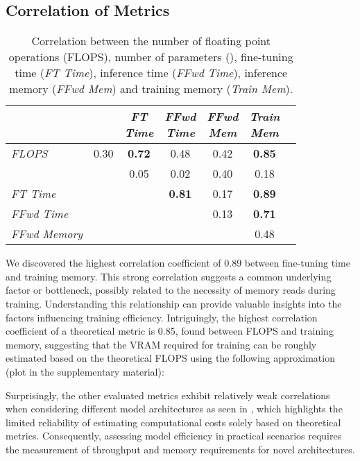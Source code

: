 \subsection{Correlation of Metrics}
\begin{table}
	\centering
	\begin{tabular}{l|cccccc}
		      &  & \makecell[c]{\textit{FT} \\ \textit{Time}} & \makecell[c]{\textit{FFwd} \\ \textit{Time}} & \makecell[c]{\textit{FFwd} \\ \textit{Mem}} & \makecell[c]{\textit{Train} \\ \textit{Mem}} \\
		\hline
		\textit{FLOPS}				& 0.30 & \textbf{0.72} & 0.48          & 0.42 & \textbf{0.85} \\
		\textit{}           &      & 0.05          & 0.02          & 0.40 & 0.18          \\
		\textit{FT Time}            &      &               & \textbf{0.81} & 0.17 & \textbf{0.89} \\
		\textit{FFwd Time}     		&      &               &               & 0.13 & \textbf{0.71} \\
		\textit{FFwd Memory}       	&      &               &               &      & 0.48          \\
	\end{tabular}
	\caption{Correlation between the number of floating point operations (FLOPS), number of parameters (), fine-tuning time (\textit{FT Time}), inference time (\textit{FFwd Time}), inference memory (\textit{FFwd Mem}) and training memory (\textit{Train Mem}).}
	\label{table:correlation_of_metrics}
\end{table}


We discovered the highest correlation coefficient of 0.89 between fine-tuning time and training memory. This strong correlation suggests a common underlying factor or bottleneck, possibly related to the necessity of memory reads during training. 
Understanding this relationship can provide valuable insights into the factors influencing training efficiency.
Intriguingly, the highest correlation coefficient of a theoretical metric is 0.85, found between FLOPS and training memory, suggesting that the VRAM required for training can be roughly estimated based on the theoretical FLOPS using the following approximation (plot in the supplementary material):

Surprisingly, the other evaluated metrics 
exhibit relatively weak correlations when considering different model architectures as seen in , which highlights the limited reliability of estimating computational costs solely based on theoretical metrics. 
Consequently, assessing model efficiency in practical scenarios requires the measurement of throughput and memory requirements for novel architectures.

